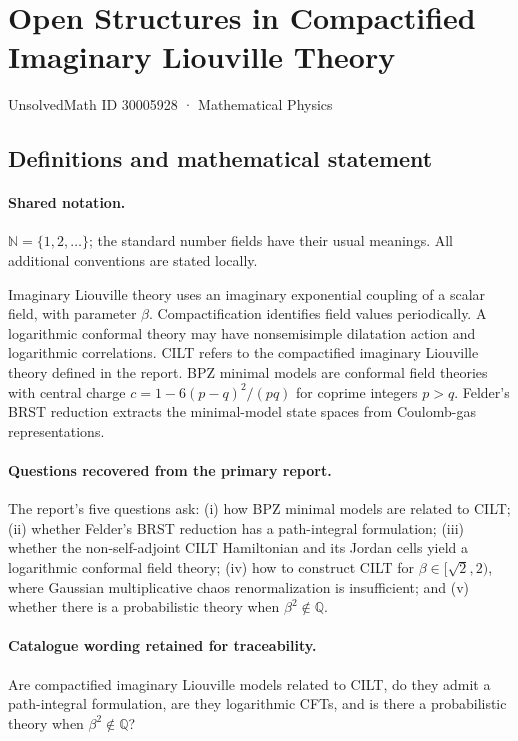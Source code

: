 \documentclass[11pt]{article}
\begin{document}
\setcounter{section}{30005927}
\section{Open Structures in Compactified Imaginary Liouville Theory}\label{30005928}
{\small UnsolvedMath ID 30005928 · Mathematical Physics}
\subsection{Definitions and mathematical statement}

\paragraph{Shared notation.}$\mathbb N=\{1,2,\ldots\}$; the standard number fields have their usual meanings. All additional conventions are stated locally.


Imaginary Liouville theory uses an imaginary exponential coupling of a scalar field, with parameter $\beta$. Compactification identifies field values periodically. A logarithmic conformal theory may have nonsemisimple dilatation action and logarithmic correlations. CILT refers to the compactified imaginary Liouville theory defined in the report. BPZ minimal models are conformal field theories with central charge $c=1-6(p-q)^2/(pq)$ for coprime integers $p>q$. Felder's BRST reduction extracts the minimal-model state spaces from Coulomb-gas representations.

\paragraph{Questions recovered from the primary report.}The report's five questions ask: (i) how BPZ minimal models are related to CILT; (ii) whether Felder's BRST reduction has a path-integral formulation; (iii) whether the non-self-adjoint CILT Hamiltonian and its Jordan cells yield a logarithmic conformal field theory; (iv) how to construct CILT for $\beta\in[\sqrt2,2)$, where Gaussian multiplicative chaos renormalization is insufficient; and (v) whether there is a probabilistic theory when $\beta^2\notin\mathbb Q$.

\paragraph{Catalogue wording retained for traceability.}
Are compactified imaginary Liouville models related to CILT, do they admit a path-integral formulation, are they logarithmic CFTs, and is there a probabilistic theory when $\beta^2\notin\mathbb{Q}$?
\end{document}
